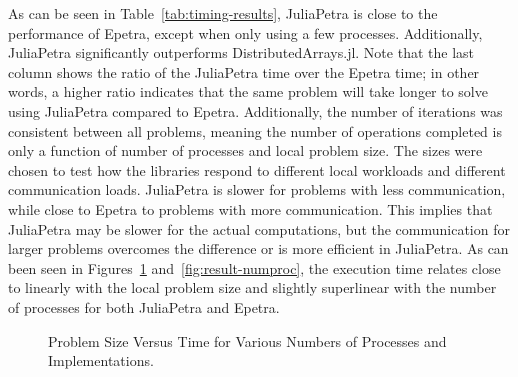 \documentclass[acmsmall]{acmart}
\begin{document}
	As can be seen in Table~\ref{tab:timing-results}, JuliaPetra is close to the performance of Epetra, except when only using a few processes.
	Additionally, JuliaPetra significantly outperforms DistributedArrays.jl.
	Note that the last column shows the ratio of the JuliaPetra time over the Epetra time; in other words, a higher ratio indicates that the same problem will take longer to solve using JuliaPetra compared to Epetra.
	Additionally, the number of iterations was consistent between all problems, meaning the number of operations completed is only a function of number of processes and local problem size.
	The sizes were chosen to test how the libraries respond to different local workloads and different communication loads.
	JuliaPetra is slower for problems with less communication, while close to Epetra to problems with more communication.
	This implies that JuliaPetra may be slower for the actual computations, but the communication for larger problems overcomes the difference or is more efficient in JuliaPetra.
	As can been seen in Figures~\ref{fig:result-localsize} and~\ref{fig:result-numproc}, the execution time relates close to linearly with the local problem size and slightly superlinear with the number of processes for both JuliaPetra and Epetra.
	
	\begin{figure}
		\caption{Problem Size Versus Time for Various Numbers of Processes and Implementations.}
		\label{fig:result-localsize}
	\end{figure}
	
\end{document}
